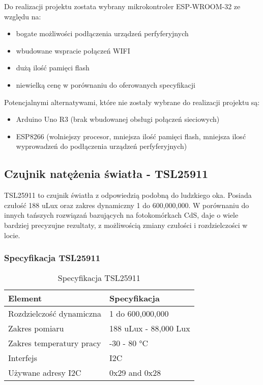 \documentclass[12pt,a4paper]{article}
\begin{document}
Do realizacji projektu zostata wybrany mikrokontroler ESP-WROOM-32 ze względu na:

\begin{itemize}
    \item bogate możliwości podłączenia urządzeń perfyferyjnych
    \item wbudowane wspracie połączeń WIFI
    \item dużą ilość pamięci flash
    \item niewielką cenę w porównaniu do oferowanych specyfikacji
\end{itemize}

\bigskip
Potencjalnymi alternatywami, które nie zostały wybrane do realizacji projektu są:
\begin{itemize}
    \item Arduino Uno R3 (brak wbudowanej obsługi połączeń sieciowych)
    \item ESP8266 (wolniejszy procesor, mniejsza ilość pamięci flash, mniejsza ilosć wyprowadzeń do podłączenia urządzeń perfyferyjnych)
\end{itemize}

\subsection{Czujnik natężenia światła - TSL25911}

TSL25911 to czujnik światła z odpowiedzią podobną do ludzkiego oka. Posiada czułość 188 uLux oraz zakres dynamiczny 1 do 600,000,000.
W porównaniu do innych tańszych rozwiązań bazujących na fotokomórkach CdS, daje o wiele bardziej precyzujne rezultaty, z możliwością zmiany czułości i
rozdzielczości w locie. 

\subsubsection{Specyfikacja TSL25911}

\begin{table}[H]
    \centering
    \begin{tabular}{|l|l|}
        \hline
        Element & Specyfikacja \\
        \hline
        Rozdzielczość dynamiczna & 1 do 600,000,000 \\
        \hline
        Zakres pomiaru & 188 uLux - 88,000 Lux \\
        \hline
        Zakres temperatury pracy & -30 - 80 °C \\
        \hline
        Interfejs & I2C \\
        \hline
        Używane adresy I2C & 0x29 and 0x28 \\
        \hline
    \end{tabular}
    \caption{Specyfikacja TSL25911}
    \label{tsl25911-spec}
\end{table}
\end{document}
